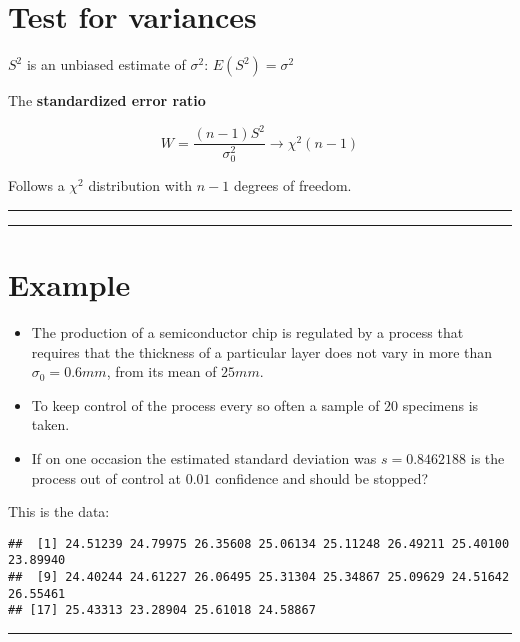 \documentclass[
]{book}
\begin{document}
\hypertarget{test-for-variances-3}{%
\section{Test for variances}\label{test-for-variances-3}}

\(S^2\) is an unbiased estimate of \(\sigma^2\): \(E(S^2)=\sigma^2\)

The \textbf{standardized error ratio}

\[W=\frac{(n-1)S^2}{\sigma_0^2} \rightarrow \chi^2(n-1)\]

Follows a \(\chi^2\) distribution with \(n-1\) degrees of freedom.

\begin{center}\rule{0.5\linewidth}{0.5pt}\end{center}

\begin{center}\rule{0.5\linewidth}{0.5pt}\end{center}

\hypertarget{example-21}{%
\section{Example}\label{example-21}}

\begin{itemize}
\item
  The production of a semiconductor chip is regulated by a process that requires that the thickness of a particular layer does not vary in more than \(\sigma_0=0.6mm\), from its mean of \(25mm\).
\item
  To keep control of the process every so often a sample of \(20\) specimens is taken.
\item
  If on one occasion the estimated standard deviation was \(s=0.8462188\) is the process out of control at \(0.01\) confidence and should be stopped?
\end{itemize}

This is the data:

\begin{verbatim}
##  [1] 24.51239 24.79975 26.35608 25.06134 25.11248 26.49211 25.40100 23.89940
##  [9] 24.40244 24.61227 26.06495 25.31304 25.34867 25.09629 24.51642 26.55461
## [17] 25.43313 23.28904 25.61018 24.58867
\end{verbatim}

\begin{center}\rule{0.5\linewidth}{0.5pt}\end{center}
\end{document}
